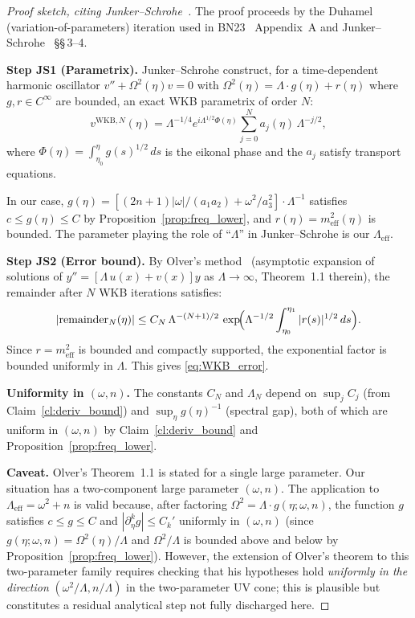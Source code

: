 \documentclass[11pt, a4paper]{article}
\newcommand{\om}{\omega}
\newcommand{\Lam}{\Lambda}
\begin{document}
\begin{proof}[Proof sketch, citing Junker--Schrohe~\cite{JS02}]
  The proof proceeds by the Duhamel (variation-of-parameters) iteration used
  in BN23~\cite{BN23} Appendix~A and Junker--Schrohe~\cite{JS02} \S\S\,3--4.

  \textbf{Step JS1 (Parametrix).}
  Junker--Schrohe construct, for a time-dependent harmonic oscillator
  $v'' + \Omega^2(\eta) v = 0$ with $\Omega^2(\eta) = \Lam \cdot g(\eta) + r(\eta)$
  where $g, r \in C^\infty$ are bounded, an exact WKB parametrix of order $N$:
  \begin{equation}
    v^{\mathrm{WKB},N}(\eta) = \Lam^{-1/4} e^{i\Lam^{1/2}\Phi(\eta)}
    \sum_{j=0}^{N} a_j(\eta)\,\Lam^{-j/2},
  \end{equation}
  where $\Phi(\eta) = \int_{\eta_0}^\eta g(s)^{1/2}\,ds$ is the eikonal phase
  and the $a_j$ satisfy transport equations.

  In our case, $g(\eta) = [(2n+1)|\om|/(a_1 a_2) + \om^2/a_3^2]\cdot\Lam^{-1}$
  satisfies $c \leq g(\eta) \leq C$ by Proposition~\ref{prop:freq_lower},
  and $r(\eta) = m_{\mathrm{eff}}^2(\eta)$ is bounded.
  The parameter playing the role of ``$\Lam$'' in Junker--Schrohe is
  our $\Lam_{\mathrm{eff}}$.

  \textbf{Step JS2 (Error bound).}
  By Olver's method~\cite{Olver74} (asymptotic expansion of solutions of
  $y'' = [\Lam\,u(x) + v(x)]y$ as $\Lam \to \infty$, Theorem~1.1 therein),
  the remainder after $N$ WKB iterations satisfies:
  \begin{equation}
    \left|\text{remainder}_N(\eta)\right|
    \leq C_N\,\Lam^{-(N+1)/2}\,\exp\!\Bigl(\Lam^{-1/2}\int_{\eta_0}^{\eta_1}
    |r(s)|^{1/2}\,ds\Bigr).
  \end{equation}
  Since $r = m_{\mathrm{eff}}^2$ is bounded and compactly supported,
  the exponential factor is bounded uniformly in $\Lam$.
  This gives \eqref{eq:WKB_error}.

  \textbf{Uniformity in $(\om, n)$.}
  The constants $C_N$ and $\Lam_N$ depend on $\sup_j C_j$ (from
  Claim~\ref{cl:deriv_bound}) and $\sup_\eta g(\eta)^{-1}$ (spectral gap),
  both of which are uniform in $(\om, n)$ by Claim~\ref{cl:deriv_bound}
  and Proposition~\ref{prop:freq_lower}.

  \textbf{Caveat.}
  Olver's Theorem~1.1 \cite{Olver74} is stated for a single large parameter.
  Our situation has a two-component large parameter $(\om, n)$.
  The application to $\Lam_{\mathrm{eff}} = \om^2 + n$ is valid because,
  after factoring $\Omega^2 = \Lam \cdot g(\eta; \om, n)$,
  the function $g$ satisfies $c \leq g \leq C$ and $|\partial_\eta^k g|
  \leq C_k'$ uniformly in $(\om, n)$
  (since $g(\eta;\om,n) = \Omega^2(\eta)/\Lam$ and $\Omega^2/\Lam$ is bounded
  above and below by Proposition~\ref{prop:freq_lower}).
  However, the extension of Olver's theorem to this two-parameter family
  requires checking that his hypotheses hold \emph{uniformly in the direction}
  $(\om^2 / \Lam, n/\Lam)$ in the two-parameter UV cone; this is plausible
  but constitutes a residual analytical step not fully discharged here.
\end{proof}
\end{document}
